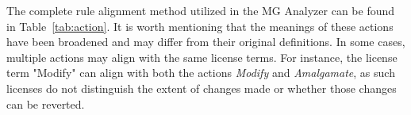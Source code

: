 





The complete rule alignment method utilized in the MG Analyzer can be found in Table~\ref{tab:action}.
It is worth mentioning that the meanings of these actions have been broadened and may differ from their original definitions. 
In some cases, multiple actions may align with the same license terms. 
For instance, the license term "Modify" can align with both the actions \emph{Modify} and \emph{Amalgamate}, as such licenses do not distinguish the extent of changes made or whether those changes can be reverted.

